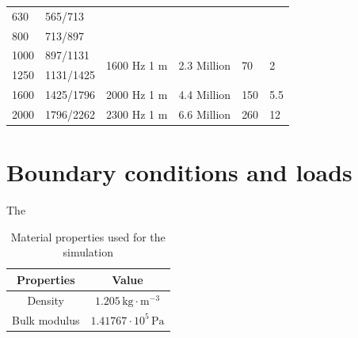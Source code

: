 \begin{table}[H]
\begin{tabularx}{\textwidth}{|X|X|c|X|X|X|}
		630                              & 565/713                    &                                 &                               &                         &                                        \\ \cline{1-2}
		800                              & 713/897                    &                                 &                               &                         &                                        \\ \hline
		1000                             & 897/1131                   & \multirow{2}{*}{1600 Hz 1 m}    & \multirow{2}{*}{2.3 Million}  & \multirow{2}{*}{70}     & \multirow{2}{*}{2}                     \\ \cline{1-2}
		1250                             & 1131/1425                  &                                 &                               &                         &                                        \\ \hline
		1600                             & 1425/1796                  & 2000 Hz 1 m                     & 4.4 Million                   & 150                     & 5.5                                    \\ \hline
		2000                             & 1796/2262                  & 2300 Hz 1 m                     & 6.6 Million                   & 260                     & 12                                     \\ \hline
	\end{tabularx}
\end{table}


\section{Boundary conditions and loads}
\label{section:boundary_conditions}


The 

\begin{table}[H]
	\centering
	\caption{Material properties used for the simulation}
	\begin{tabular}{|c|c|}
		\hline
		\textbf{Properties} & \textbf{Value}                   \\ \hline
		Density             &  $1.205\,\text{kg}\cdot \text{m}^{-3}$                     \\ \hline
		Bulk modulus        &  $1.41767\cdot10^5\,\text{Pa}$ \\ \hline
	\end{tabular}
\end{table}

